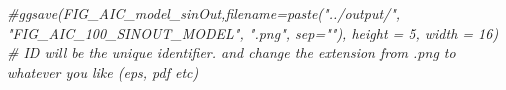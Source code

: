 \documentclass[
]{article}
\newenvironment{Shaded}{\begin{snugshade}}{\end{snugshade}}
\newcommand{\CommentTok}[1]{\textcolor[rgb]{0.56,0.35,0.01}{\textit{#1}}}
\begin{document}
\begin{Shaded}
\begin{Highlighting}[]
\CommentTok{\#ggsave(FIG\_AIC\_model\_sinOut,filename=paste("../output/", "FIG\_AIC\_100\_SINOUT\_MODEL", ".png", sep=""),  height = 5, width = 16) \# ID will be the unique identifier. and change the extension from .png to whatever you like (eps, pdf etc)}
\end{Highlighting}
\end{Shaded}
\end{document}

